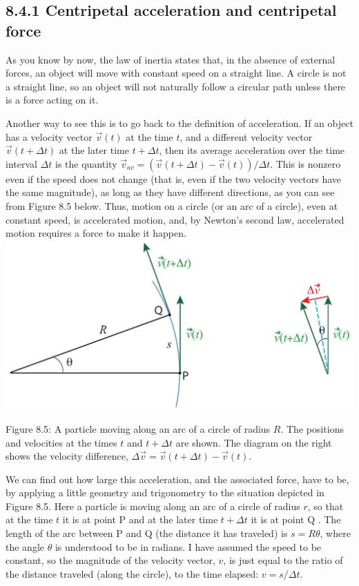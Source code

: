 \documentclass[10pt]{article}
\begin{document}
\subsection*{8.4.1 Centripetal acceleration and centripetal force}
As you know by now, the law of inertia states that, in the absence of external forces, an object will move with constant speed on a straight line. A circle is not a straight line, so an object will not naturally follow a circular path unless there is a force acting on it.

Another way to see this is to go back to the definition of acceleration. If an object has a velocity vector $\vec{v}(t)$ at the time $t$, and a different velocity vector $\vec{v}(t+\Delta t)$ at the later time $t+\Delta t$, then its average acceleration over the time interval $\Delta t$ is the quantity $\vec{v}_{a v}=(\vec{v}(t+\Delta t)-\vec{v}(t)) / \Delta t$. This is nonzero even if the speed does not change (that is, even if the two velocity vectors have the same magnitude), as long as they have different directions, as you can see from Figure 8.5 below. Thus, motion on a circle (or an arc of a circle), even at constant speed, is accelerated motion, and, by Newton's second law, accelerated motion requires a force to make it happen.\\
\includegraphics[max width=\textwidth, center]{2024_09_14_9969b06773f10b6936e8g-188}

Figure 8.5: A particle moving along an arc of a circle of radius $R$. The positions and velocities at the times $t$ and $t+\Delta t$ are shown. The diagram on the right shows the velocity difference, $\Delta \vec{v}=\vec{v}(t+\Delta t)-\vec{v}(t)$.

We can find out how large this acceleration, and the associated force, have to be, by applying a little geometry and trigonometry to the situation depicted in Figure 8.5. Here a particle is moving along an arc of a circle of radius $r$, so that at the time $t$ it is at point P and at the later time $t+\Delta t$ it is at point Q . The length of the arc between P and Q (the distance it has traveled) is $s=R \theta$, where the angle $\theta$ is understood to be in radians. I have assumed the speed to be constant, so the magnitude of the velocity vector, $v$, is just equal to the ratio of the distance traveled (along the circle), to the time elapsed: $v=s / \Delta t$.
\end{document}
